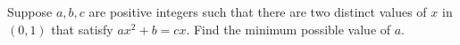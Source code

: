 Suppose $a,b,c$ are positive integers such that there are two distinct values of $x$ in $\left(0,1\right)$ that satisfy $ax^2+b=cx$. Find the minimum possible value of $a$.